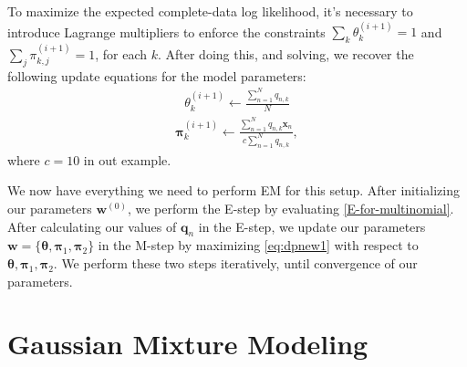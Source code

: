 \documentclass[12pt,letterpaper]{article}
\begin{document}
To maximize the expected complete-data log likelihood, it's necessary to introduce Lagrange multipliers to enforce the constraints $\sum_{k} \theta_k^{(i+1)} = 1$ and $\sum_{j} \pi_{k, j}^{(i+1)} = 1$, for each $k$. After doing this,
and solving, we recover the following update equations for the model parameters:
%
\begin{align*}
    \theta_{k}^{(i+1)} \leftarrow \frac{\sum_{n=1}^{N} q_{n, k}}{N}
\end{align*}
\begin{align*}
    \boldsymbol{\pi}_{k}^{(i+1)} \leftarrow \frac{\sum_{n=1}^{N} q_{n, k} \textbf{x}_{n}}{c \sum_{n=1}^{N} q_{n, k} },
\end{align*}
%
where $c=10$ in out example.

We now have everything we need to perform EM for this setup. After initializing our parameters $\textbf{w}^{(0)}$, we perform the E-step by evaluating \ref{E-for-multinomial}. After calculating our values of $\textbf{q}_n$ in the E-step, we update our parameters $\textbf{w} = \{\boldsymbol{\theta}, \boldsymbol{\pi}_1, \boldsymbol{\pi}_2 \}$ in the M-step by maximizing \ref{eq:dpnew1} with respect to $\boldsymbol{\theta}, \boldsymbol{\pi}_1, \boldsymbol{\pi}_2$. We perform these two steps iteratively, until convergence of our parameters.

\section{Gaussian Mixture Modeling}

\end{document}
